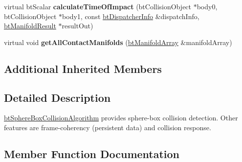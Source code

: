 \begin{DoxyCompactItemize}
\item 
\mbox{\label{classbtConvexPlaneCollisionAlgorithm_a76e90ad1a8a4f7044f4ee86127136635}} 
virtual bt\+Scalar {\bfseries calculate\+Time\+Of\+Impact} (bt\+Collision\+Object $\ast$body0, bt\+Collision\+Object $\ast$body1, const \hyperlink{structbtDispatcherInfo}{bt\+Dispatcher\+Info} \&dispatch\+Info, \hyperlink{classbtManifoldResult}{bt\+Manifold\+Result} $\ast$result\+Out)
\item 
\mbox{\label{classbtConvexPlaneCollisionAlgorithm_a9c5fc2f47f528052d57c2d2158f5e05e}} 
virtual void {\bfseries get\+All\+Contact\+Manifolds} (\hyperlink{classbtAlignedObjectArray}{bt\+Manifold\+Array} \&manifold\+Array)
\end{DoxyCompactItemize}
\subsection*{Additional Inherited Members}


\subsection{Detailed Description}
\hyperlink{classbtSphereBoxCollisionAlgorithm}{bt\+Sphere\+Box\+Collision\+Algorithm} provides sphere-\/box collision detection. Other features are frame-\/coherency (persistent data) and collision response. 

\subsection{Member Function Documentation}
\mbox{\label{classbtConvexPlaneCollisionAlgorithm_a79f8384fcdc2145be9fca0057edc8b69}} 
